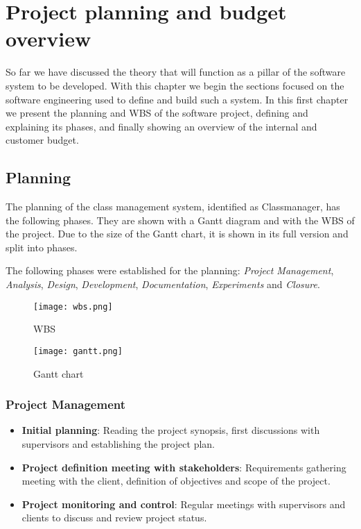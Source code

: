 \renewcommand{\documentname}{Project planning and budget overview}

\chapter{Project planning and budget overview}

So far we have discussed the theory that will function as a pillar of the software system to be developed. With this chapter we begin the sections focused on the software engineering used to define and build such a system. In this first chapter we present the planning and WBS of the software project, defining and explaining its phases, and finally showing an overview of the internal and customer budget.


\section{Planning}

The planning of the class management system, identified as Classmanager, has the following phases. They are shown with a Gantt diagram and with the WBS of the project. Due to the size of the Gantt chart, it is shown in its full version and split into phases. 

The following phases were established for the planning: \textit{Project Management}, \textit{Analysis}, \textit{Design}, \textit{Development}, \textit{Documentation}, \textit{Experiments} and \textit{Closure}.


\begin{figure}[H]
    \caption{WBS}
  \centering
  \texttt{[image: wbs.png]}
\end{figure}


\begin{figure}[H]
    \caption{Gantt chart}
  \centering
  \texttt{[image: gantt.png]}
\end{figure}


\subsection{Project Management}

\begin{itemize}
    \item \textbf{Initial planning}: Reading the project synopsis, first discussions with supervisors and establishing the project plan. 
    \item \textbf{Project definition meeting with stakeholders}: Requirements gathering meeting with the client, definition of objectives and scope of the project.
    \item \textbf{Project monitoring and control}: Regular meetings with supervisors and clients to discuss and review project status. 
\end{itemize}

